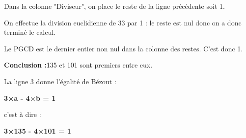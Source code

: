 \par
Dans la colonne "Diviseur", on place le reste de la ligne précédente soit 1.
\par
On effectue la division euclidienne de 33 par 1 : le reste est nul donc on a donc terminé le calcul.
\par
Le PGCD est le dernier entier non nul dans la colonne des restes. C'est donc 1.
\par
\textbf{Conclusion :}135 et 101 sont premiers entre eux.
\par
La ligne 3 donne l'égalité de Bézout :
\begin{center}\textbf{3×a - 4×b = 1}\end{center}
c'est à dire :
\begin{center}\textbf{3×135 - 4×101 = 1}\end{center}
